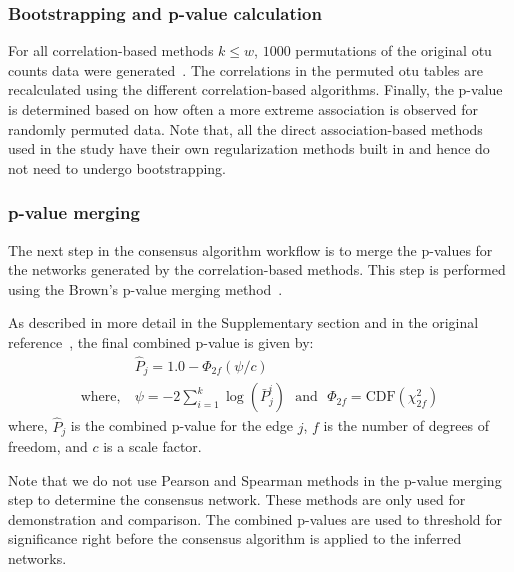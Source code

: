 \documentclass[letterpaper,12pt]{article}
\begin{document}
  \subsubsection*{Bootstrapping and p-value calculation}
  \vspace{-5mm}
  For all correlation-based methods $k \le w$, $1000$ permutations of the original \ac{otu} counts data were generated~\cite{Watts2018}.
  The correlations in the permuted \ac{otu} tables are recalculated using the different correlation-based algorithms.
  Finally, the p-value is determined based on how often a more extreme association is observed for randomly permuted data.
  Note that, all the direct association-based methods used in the study have their own regularization methods built in and hence do not need to undergo bootstrapping.

  \subsubsection*{p-value merging}
  \vspace{-5mm}
  The next step in the consensus algorithm workflow is to merge the p-values for the networks generated by the correlation-based methods.
  This step is performed using the Brown's p-value merging method~\cite{Poole_Gibbs_Shmulevich_Bernard_Knijnenburg_2016,faustCoNetAppInference2016}.

  As described in more detail in the Supplementary section and in the original reference~\cite{Poole_Gibbs_Shmulevich_Bernard_Knijnenburg_2016}, the final combined p-value is given by:
  \begin{equation}
    \begin{aligned}
        & \hat{P}_j = 1.0 - \Phi_{2f}\left( \psi / c \right) \\
        \text{where},~ &\psi = -2 \sum_{i=1}^k \log(\bar{P}^i_j) ~~~\text{and}~~~ \Phi_{2f} = \mathrm{CDF}\left( \chi^2_{2f} \right)
    \end{aligned}
    \label{eqn:pvalue-combined}
  \end{equation}
  where, $\hat{P}_j$ is the combined p-value for the edge $j$, $f$ is the number of degrees of freedom, and $c$ is a scale factor.

  Note that we do not use Pearson and Spearman methods in the p-value merging step to determine the consensus network.
  These methods are only used for demonstration and comparison.
  The combined p-values are used to threshold for significance right before the consensus algorithm is applied to the inferred networks.
\end{document}

